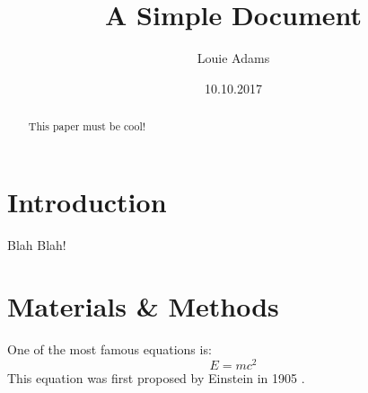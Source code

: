 \documentclass[12pt]{article}
\title{A Simple Document}
\author{Louie Adams}
\date{10.10.2017}
\begin{document}
	\maketitle
	
	\begin{abstract}
		This paper must be cool!
	\end{abstract}
	
	\section{Introduction}
		Blah Blah!
		
	\section{Materials \& Methods}
	One of the most famous equations is:
	\begin{equation}
		E = mc^2
	\end{equation}
	This equation was first proposed by Einstein in 1905
	\cite{einstein1905does}.
	
	
	
\end{document}
